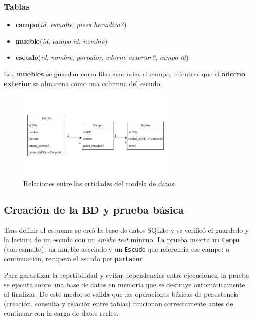 \subsubsection{Tablas}
\begin{itemize}
    \item \textbf{campo}(\textit{id}, \textit{esmalte}, \textit{pieza heraldica?})
    \item \textbf{mueble}(\textit{id}, \textit{campo id}, \textit{nombre})
    \item \textbf{escudo}(\textit{id}, \textit{nombre}, \textit{portador}, \textit{adorno exterior?}, \textit{campo id})
\end{itemize}

Los \textbf{muebles} se guardan como filas asociadas al campo, mientras que el \textbf{adorno exterior} 
se almacena como una columna del escudo.

\begin{figure}[H]
    \centering
    \includegraphics[width=0.7\textwidth]{figuras/diagramaBD.jpg}
    \caption{Relaciones entre las entidades del modelo de datos.}
    \label{fig:diagrama-bd}
\end{figure}

\subsection{Creación de la BD y prueba básica}
Tras definir el esquema se creó la base de datos SQLite y se verificó el guardado y la lectura de un escudo con un 
\emph{smoke test} mínimo. La prueba inserta un \texttt{Campo} (con esmalte), un mueble asociado y un \texttt{Escudo} que 
referencia ese campo; a continuación, recupera el escudo por \texttt{portador}. 

Para garantizar la repetibilidad y evitar dependencias entre ejecuciones, la prueba se ejecuta sobre una base de datos 
en memoria que se destruye automáticamente al finalizar. De este modo, se valida que las operaciones básicas de 
persistencia (creación, consulta y relación entre tablas) funcionan correctamente antes de continuar con la carga 
de datos reales.